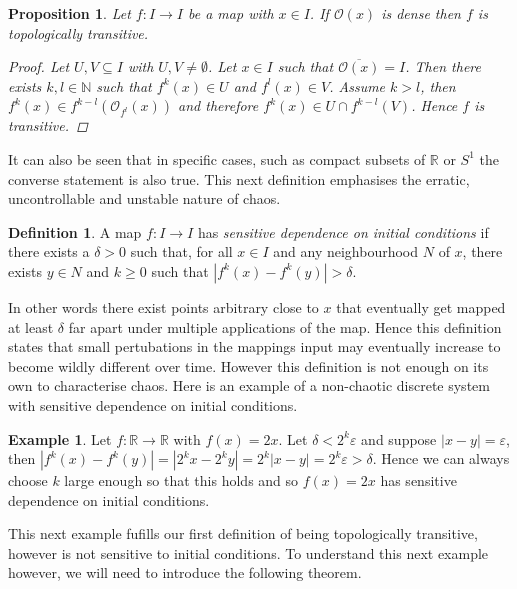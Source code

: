 \documentclass[11pt,a4paper,oneside]{memoir}
\theoremstyle{plain}
\newtheorem{prop}[thm]{Proposition}
\theoremstyle{definition}
\newtheorem{defn}[thm]{Definition}
\newtheorem{exmp}[thm]{Example}
\begin{document}
\begin{prop} \label{prop:dense-transitive}
    Let $f: I \to I$ be a map with $x \in I$. If $\mathcal{O}(x)$ is dense then $f$ is topologically transitive.
    \begin{proof}
        Let $U, V \subseteq I$ with $U, V \neq \emptyset$. Let $x \in I$ such that $\overline{\mathcal{O}(x)} = I$. Then there exists $k, l \in \mathbb{N}$ such that $f^k(x) \in U$ and $f^l(x) \in V$. Assume $k > l$, then $f^k(x) \in f^{k - l}\left( \mathcal{O}_{f^l}(x) \right)$ and therefore $f^k(x) \in U \cap f^{k-l}(V)$. Hence $f$ is transitive.
    \end{proof}
\end{prop}

It can also be seen that in specific cases, such as compact subsets of $\mathbb{R}$ or $S^1$ the converse statement is also true. This next definition emphasises the erratic, uncontrollable and unstable nature of chaos.

\begin{defn}
    A map $f: I \to I$ has \emph{sensitive dependence on initial conditions} if there exists a $\delta > 0$ such that, for all $x \in I$ and any neighbourhood $N$ of $x$, there exists $y \in N$ and $k \geq 0$ such that $\left\lvert f^k(x) - f^k(y) \right\rvert > \delta$.
\end{defn}

In other words there exist points arbitrary close to $x$ that eventually get mapped at least $\delta$ far apart under multiple applications of the map. Hence this definition states that small pertubations in the mappings input may eventually increase to become wildly different over time. However this definition is not enough on its own to characterise chaos. Here is an example of a non-chaotic discrete system with sensitive dependence on initial conditions.

\begin{exmp} \label{exmp:2x}
    Let $f: \mathbb{R} \to \mathbb{R}$ with $f(x) = 2x$. Let $\delta < 2^k \varepsilon$ and suppose $|x - y| = \varepsilon$, then $\left\lvert f^k(x) - f^k(y) \right\rvert = \left\lvert 2^k x - 2^k y \right\rvert = 2^k \left\lvert x - y \right\rvert = 2^k \varepsilon > \delta$. Hence we can always choose $k$ large enough so that this holds and so $f(x) = 2x$ has sensitive dependence on initial conditions.
\end{exmp}

This next example fufills our first definition of being topologically transitive, however is not sensitive to initial conditions. To understand this next example however, we will need to introduce the following theorem.
\end{document}
